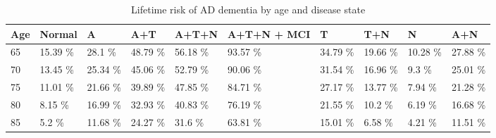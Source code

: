 \begin{table}[ht]
\centering
\begin{tabular}{llllllllll}
  \hline
Age & Normal & A & A+T & A+T+N & A+T+N + MCI & T & T+N & N & A+N \\ 
  \hline
65 & 15.39 \% & 28.1 \% & 48.79 \% & 56.18 \% & 93.57 \% & 34.79 \% & 19.66 \% & 10.28 \% & 27.88 \% \\ 
  70 & 13.45 \% & 25.34 \% & 45.06 \% & 52.79 \% & 90.06 \% & 31.54 \% & 16.96 \% & 9.3 \% & 25.01 \% \\ 
  75 & 11.01 \% & 21.66 \% & 39.89 \% & 47.85 \% & 84.71 \% & 27.17 \% & 13.77 \% & 7.94 \% & 21.28 \% \\ 
  80 & 8.15 \% & 16.99 \% & 32.93 \% & 40.83 \% & 76.19 \% & 21.55 \% & 10.2 \% & 6.19 \% & 16.68 \% \\ 
  85 & 5.2 \% & 11.68 \% & 24.27 \% & 31.6 \% & 63.81 \% & 15.01 \% & 6.58 \% & 4.21 \% & 11.51 \% \\ 
   \hline
\end{tabular}
\caption{Lifetime risk of AD dementia by age and disease state} 
\end{table}

